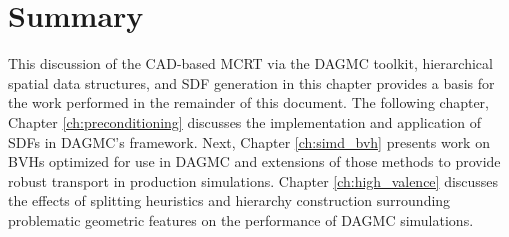\section{Summary}

This discussion of the CAD-based MCRT via the DAGMC toolkit, hierarchical
spatial data structures, and SDF generation in this chapter provides a basis for
the work performed in the remainder of this document. The following chapter,
Chapter \ref{ch:preconditioning} discusses the implementation and application of
SDFs in DAGMC's framework. Next, Chapter \ref{ch:simd_bvh} presents work on BVHs
optimized for use in DAGMC and extensions of those methods to provide robust
transport in production simulations. Chapter \ref{ch:high_valence} discusses the
effects of splitting heuristics and hierarchy construction surrounding
problematic geometric features on the performance of DAGMC simulations.
